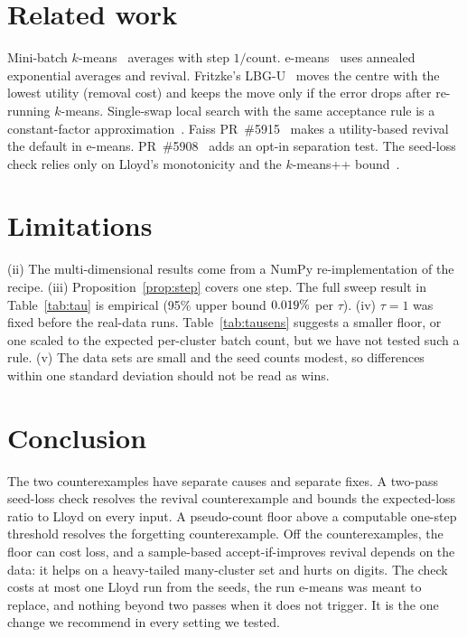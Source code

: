 \documentclass[11pt]{article}
\theoremstyle{remark}
\begin{document}
\section{Related work}
Mini-batch $k$-means~\cite{sculley2010} averages with step $1/\text{count}$. e-means~\cite{bessa2026}
uses annealed exponential averages and revival. Fritzke's LBG-U~\cite{fritzke1997} moves the
centre with the lowest utility (removal cost) and keeps the move only if the error drops after
re-running $k$-means. Single-swap local search with the same acceptance rule is a constant-factor
approximation~\cite{kanungo2004}. Faiss PR~\#5915~\cite{pr5915} makes a utility-based revival the
default in e-means. PR~\#5908~\cite{pr5908} adds an opt-in separation test. The seed-loss check
relies only on Lloyd's monotonicity and the $k$-means++ bound~\cite{arthur2007}.

\section{Limitations}
 (ii) The multi-dimensional results come from a NumPy re-implementation of the recipe.
(iii) Proposition~\ref{prop:step} covers one step. The full sweep result in Table~\ref{tab:tau} is
empirical (95\% upper bound $0.019\%$ per $\tau$). (iv) $\tau=1$ was fixed before the
real-data runs. Table~\ref{tab:tausens} suggests a smaller floor, or one scaled to the expected
per-cluster batch count, but we have not tested such a rule. (v) The data sets are small and the
seed counts modest, so differences within one standard deviation should not be read as wins.

\section{Conclusion}
The two counterexamples have separate causes and separate fixes. A two-pass seed-loss check
resolves the revival counterexample and bounds the expected-loss ratio to Lloyd on every input.
A pseudo-count floor above a computable one-step threshold resolves the forgetting
counterexample. Off the counterexamples, the floor can cost loss, and a sample-based
accept-if-improves revival depends on the data: it helps on a heavy-tailed many-cluster set and
hurts on digits. The check costs at most one Lloyd run from the seeds, the run e-means was meant
to replace, and nothing beyond two passes when it does not trigger. It is the one change we
recommend in every setting we tested.
\end{document}
